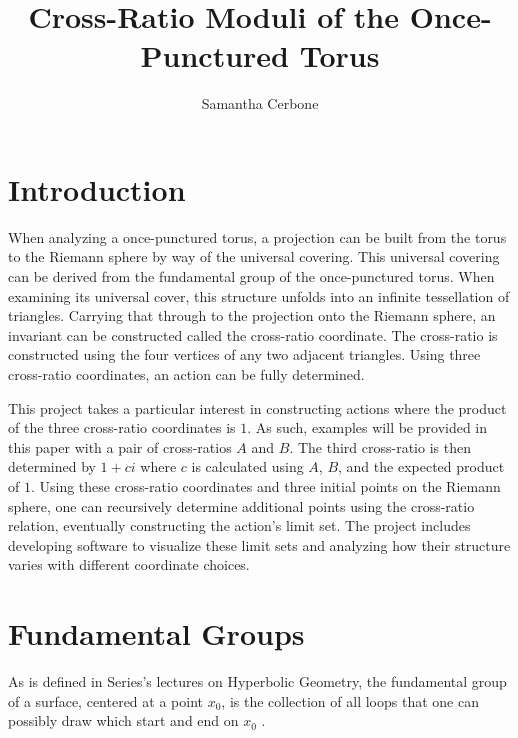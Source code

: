 \documentclass[12pt,a4paper,reqno,parskip=full]{amsart}
\numberwithin{equation}{section}
\theoremstyle{plain}
\theoremstyle{definition}
\begin{document}
\title{Cross-Ratio Moduli of the Once-Punctured Torus}


\author{Samantha Cerbone}

\maketitle

\tableofcontents
\newpage
\section{Introduction}

When analyzing a once-punctured torus, a projection can be built from the torus to the Riemann sphere by way of the universal covering. This universal covering can be derived from the fundamental group of the once-punctured torus. When examining its universal cover, this structure unfolds into an infinite tessellation of triangles. Carrying that through to the projection onto the Riemann sphere, an invariant can be constructed called the cross-ratio coordinate. The cross-ratio is constructed using the four vertices of any two adjacent triangles. Using three cross-ratio coordinates, an action can be fully determined.

This project takes a particular interest in constructing actions where the product of the three cross-ratio coordinates is $1$. As such, examples will be provided in this paper with a pair of cross-ratios $A$ and $B$. The third cross-ratio is then determined by $1+ci$ where $c$ is calculated using $A$, $B$, and the expected product of $1$. Using these cross-ratio coordinates and three initial points on the Riemann sphere, one can recursively determine additional points using the cross-ratio relation, eventually constructing the action's limit set. The project includes developing software to visualize these limit sets and analyzing how their structure varies with different coordinate choices.

\section{Fundamental Groups}

As is defined in Series's lectures on Hyperbolic Geometry, the fundamental group of a surface, centered at a point $x_0$, is the collection of all loops that one can possibly draw which start and end on $x_0$ \cite{Series_Maloni_2013}. 
\end{document}
